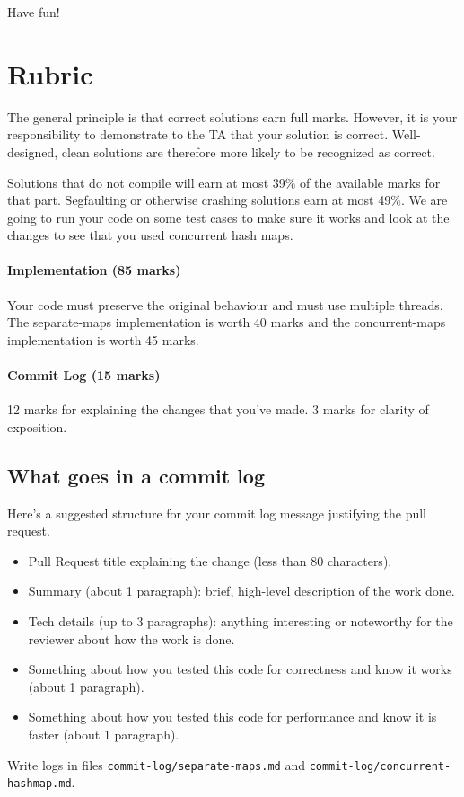 \documentclass[12pt]{article}
\renewcommand{\_}{\kern-1.5pt\textunderscore\kern-1.5pt}
\begin{document}
Have fun!

\section*{Rubric}
The general principle is that correct solutions earn full marks. However, it is your responsibility to demonstrate to the TA that your solution is correct. Well-designed, clean solutions are therefore more likely to be recognized as correct. \par

Solutions that do not compile will earn at most 39$\%$ of the available marks for that part. Segfaulting or otherwise crashing solutions earn at most 49$\%$. We are going to run your code on some test cases to make sure it works and look at the changes to see that you used concurrent hash maps.

\paragraph{Implementation (85 marks)} Your code must preserve the original behaviour and must use multiple threads. The separate-maps implementation is worth 40 marks and the concurrent-maps implementation is worth 45 marks.

\paragraph{Commit Log (15 marks)} 12 marks for explaining the changes that you've made. 3 marks for clarity of exposition. 

\subsection*{What goes in a commit log}
Here's a suggested structure for your commit log message justifying the pull request.
\begin{itemize}
\item Pull Request title explaining the change (less than 80 characters).
\item Summary (about 1 paragraph): brief, high-level description of the work done.
\item Tech details (up to 3 paragraphs): anything interesting or noteworthy for the reviewer about how the work is done. 
\item Something about how you tested this code for correctness and know it works (about 1 paragraph).
\item Something about how you tested this code for performance and know it is faster (about 1 paragraph).
\end{itemize}
Write logs in files {\tt commit-log/separate-maps.md} and {\tt commit-log/concurrent-hashmap.md}.
\end{document}
